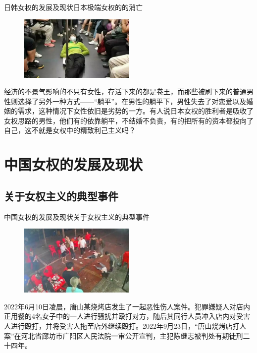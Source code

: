 \documentclass{beamer}
\begin{document}
	\begin{frame}{日韩女权的发展及现状}{日本极端女权的的消亡}
		\begin{figure}
			\centering
			\includegraphics[width=0.5\textwidth]{img/图片23.png}
		\end{figure}

		经济的不景气影响的不只有女性，存活下来的都是卷王，而那些被刷下来的普通男性则选择了另外一种方式——“躺平”。在男性的躺平下，男性失去了对恋爱以及婚姻的需求，这种情况下女性依旧是劣势的一方。有人说日本女权的胜利者是吸收了女权思路的男性，他们有的依靠躺平，不结婚不负责，有的把所有的资本都投向了自己，这不就是女权中的精致利己主义吗？
	\end{frame}
	
	\section{中国女权的发展及现状}
	\subsection*{关于女权主义的典型事件}
	\begin{frame}{中国女权的发展及现状}{关于女权主义的典型事件}
		\begin{figure}
			\centering
			\includegraphics[width=0.5\textwidth]{img/图片2.jpg}
		\end{figure}

		2022年6月10日凌晨，唐山某烧烤店发生了一起恶性伤人案件。犯罪嫌疑人对店内正用餐的4名女子中的一人进行骚扰并殴打对方，随后其同行人员冲入店内对受害人进行殴打，并将受害人拖至店外继续殴打。2022年9月23日，“唐山烧烤店打人案”在河北省廊坊市广阳区人民法院一审公开宣判，主犯陈继志被判处有期徒刑二十四年。

	\end{frame}
\end{document}
